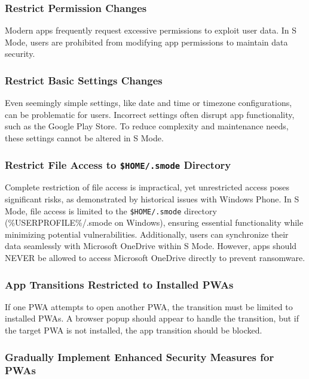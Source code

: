 \subsubsection{Restrict Permission Changes}

Modern apps frequently request excessive permissions to exploit user data. In S Mode, users are prohibited from modifying app permissions to maintain data security.

\subsubsection{Restrict Basic Settings Changes}

Even seemingly simple settings, like date and time or timezone configurations, can be problematic for users. Incorrect settings often disrupt app functionality, such as the Google Play Store. To reduce complexity and maintenance needs, these settings cannot be altered in S Mode.

\subsubsection{Restrict File Access to \texttt{\$HOME/.smode} Directory}

Complete restriction of file access is impractical, yet unrestricted access poses significant risks, as demonstrated by historical issues with Windows Phone. In S Mode, file access is limited to the \texttt{\$HOME/.smode} directory (\%USERPROFILE\%/.smode on Windows), ensuring essential functionality while minimizing potential vulnerabilities. Additionally, users can synchronize their data seamlessly with Microsoft OneDrive within S Mode. However, apps should NEVER be allowed to access Microsoft OneDrive directly to prevent ransomware.

\subsubsection{App Transitions Restricted to Installed PWAs}

If one PWA attempts to open another PWA, the transition must be limited to installed PWAs. A browser popup should appear to handle the transition, but if the target PWA is not installed, the app transition should be blocked.

\subsubsection{Gradually Implement Enhanced Security Measures for PWAs}

